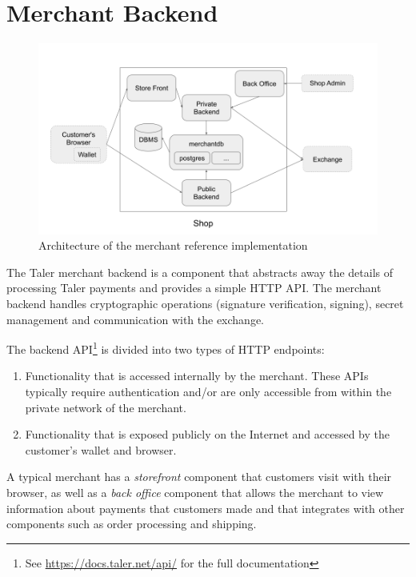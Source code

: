\section{Merchant Backend}

\begin{figure}
    \includegraphics[width=\textwidth]{diagrams/taler-diagram-merchant.png}
    \caption{Architecture of the merchant reference implementation}
\end{figure}

The Taler merchant backend is a component that abstracts away the details of
processing Taler payments and provides a simple HTTP API.  The merchant backend
handles cryptographic operations (signature verification, signing), secret
management and communication with the exchange.

The backend API\footnote{See \url{https://docs.taler.net/api/} for the full documentation}
is divided into two types of HTTP endpoints:
\begin{enumerate}
  \item Functionality that is accessed internally by the merchant.  These APIs typically
    require authentication and/or are only accessible from within the private
    network of the merchant.
  \item Functionality that is exposed publicly on the Internet and accessed by the customer's wallet and browser.
\end{enumerate}

A typical merchant has a \emph{storefront} component that customers visit with
their browser, as well as a \emph{back office} component that allows the
merchant to view information about payments that customers made and that integrates
with other components such as order processing and shipping.

